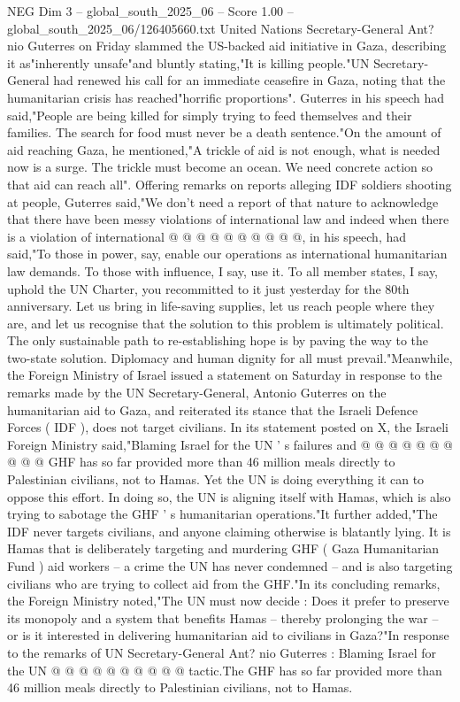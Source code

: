 \begin{textsample}{NEG Dim 3 – global\_south\_2025\_06 – Score 1.00 – global\_south\_2025\_06/126405660.txt}  \label{ex:f3_neg_255}
United Nations Secretary-General Ant? nio Guterres on Friday slammed the US-backed aid initiative in Gaza, describing it as"inherently unsafe"and bluntly stating,"It is killing people."UN Secretary-General had renewed his call for an immediate ceasefire in Gaza, noting that the humanitarian crisis has reached"horrific proportions".
Guterres in his speech had said,"People are being killed for simply trying to feed themselves and their families.
The search for food must never be a death sentence."On the amount of aid reaching Gaza, he mentioned,"A trickle of aid is not enough, what is needed now is a surge.
The trickle must become an ocean.
We need concrete action so that aid can reach all".
Offering remarks on reports alleging IDF soldiers shooting at people, Guterres said,"We don't need a report of that nature to acknowledge that there have been messy violations of international law and indeed when there is a violation of international @ @ @ @ @ @ @ @ @ @, in his speech, had said,"To those in power, say, enable our operations as international humanitarian law demands.
To those with influence, I say, use it.
To all member states, I say, uphold the UN Charter, you recommitted to it just yesterday for the 80th anniversary.
Let us bring in life-saving supplies, let us reach people where they are, and let us recognise that the solution to this problem is ultimately political.
The only sustainable path to re-establishing hope is by paving the way to the two-state solution.
Diplomacy and human dignity for all must prevail."Meanwhile, the Foreign Ministry of Israel issued a statement on Saturday in response to the remarks made by the UN Secretary-General, Antonio Guterres on the humanitarian aid to Gaza, and reiterated its stance that the Israeli Defence Forces ( IDF ), does not target civilians.
In its statement posted on X, the Israeli Foreign Ministry said,"Blaming Israel for the UN ' s failures and @ @ @ @ @ @ @ @ @ @ GHF has so far provided more than 46 million meals directly to Palestinian civilians, not to Hamas.
Yet the UN is doing everything it can to oppose this effort.
In doing so, the UN is aligning itself with Hamas, which is also trying to sabotage the GHF ' s humanitarian operations."It further added,"The IDF never targets civilians, and anyone claiming otherwise is blatantly lying.
It is Hamas that is deliberately targeting and murdering GHF ( Gaza Humanitarian Fund ) aid workers -- a crime the UN has never condemned -- and is also targeting civilians who are trying to collect aid from the GHF."In its concluding remarks, the Foreign Ministry noted,"The UN must now decide : Does it prefer to preserve its monopoly and a system that benefits Hamas -- thereby prolonging the war -- or is it interested in delivering humanitarian aid to civilians in Gaza?"In response to the remarks of UN Secretary-General Ant? nio Guterres : Blaming Israel for the UN @ @ @ @ @ @ @ @ @ @ tactic.The GHF has so far provided more than 46 million meals directly to Palestinian civilians, not to Hamas.

\end{textsample}
